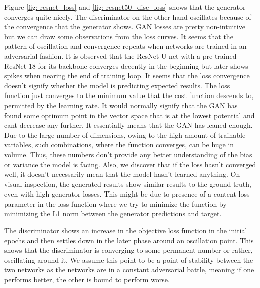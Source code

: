 \documentclass[conference]{IEEEtran}
\begin{document}
Figure \ref{fig: resnet_loss} and \ref{fig: resnet50_disc_loss} shows that the generator converges quite nicely. The discriminator on the other hand oscillates because of the convergence that the generator shows. GAN losses are pretty non-intuitive but we can draw some observations from the loss curves. It seems that the pattern of oscillation and convergence repeats when networks are trained in an adversarial fashion. It is observed that the ResNet U-net with a pre-trained ResNet-18 for its backbone converges decently in the beginning but later shows spikes when nearing the end of training loop. It seems that the loss convergence doesn't signify whether the model is predicting expected results. The loss function just converges to the minimum value that the cost function descends to, permitted by the learning rate. It would normally signify that the GAN has found some optimum point in the vector space that is at the lowest potential and cant decrease any further. It essentially means that the GAN has leaned enough. Due to the large number of dimensions, owing to the high amount of trainable variables, such combinations, where the function converges, can be huge in volume. Thus, these numbers don't provide any better understanding of the bias or variance the model is facing. Also, we discover that if the loss hasn't converged well, it doesn't necessarily mean that the model hasn't learned anything. On visual inspection, the generated results show similar results to the ground truth, even with high generator losses. This might be due to presence of a content loss parameter in the loss function where we try to minimize the function by  minimizing the L1 norm between the generator predictions and target.

The discriminator shows an increase in the objective loss function in the initial epochs and then settles down in the later phase around an oscillation point. This shows that the discriminator is converging to some permanent number or rather, oscillating around it. We assume this point to be a point of stability between the two networks as the networks are in a constant adversarial battle, meaning if one performs better, the other is bound to perform worse.
\end{document}

